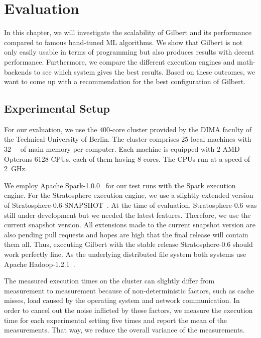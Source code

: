 \chapter{Evaluation}
\label{cha:evaluation}


In this chapter, we will investigate the scalability of Gilbert and its performance compared to famous hand-tuned ML algorithms.
We show that Gilbert is not only easily usable in terms of programming but also produces results with decent performance.
Furthermore, we compare the different execution engines and math-backends to see which system gives the best results.
Based on these outcomes, we want to come up with a recommendation for the best configuration of Gilbert.

\section{Experimental Setup}

For our evaluation, we use the $400$-core cluster provided by the DIMA faculty of the Technical University of Berlin.
The cluster comprises $25$ local machines with \SI{32}{\giga\byte} of main memory per computer.
Each machine is equipped with $2$ AMD Opterons 6128 CPUs, each of them having $8$ cores.
The CPUs run at a speed of \SI{2}{\giga\hertz}.

We employ Apache Spark-1.0.0~\cite{spark} for our test runs with the Spark execution engine.
For the Stratosphere execution engine, we use a slightly extended version of Stratosphere-0.6-SNAPSHOT~\cite{stratosphere}.
At the time of evaluation, Stratosphere-0.6 was still under development but we needed the latest features.
Therefore, we use the current snapshot version.
All extensions made to the current snapshot version are also pending pull requests and hopes are high that the final release will contain them all.
Thus, executing Gilbert with the stable release Stratosphere-0.6 should work perfectly fine.
As the underlying distributed file system both systems use Apache Hadoop-1.2.1~\cite{hadoop:2008a}.

The measured execution times on the cluster can slightly differ from measurement to measurement because of non-deterministic factors, such as cache misses, load caused by the operating system and network communication.
In order to cancel out the noise inflicted by these factors, we measure the execution time for each experimental setting five times and report the mean of the measurements.
That way, we reduce the overall variance of the measurements.

